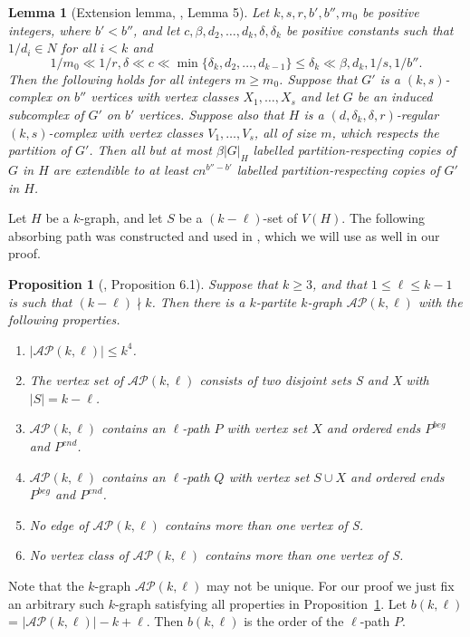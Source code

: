 \documentclass[11pt, reqno]{amsart}    	%
\newtheorem{prop}[thm]{Proposition}
\newtheorem{lemma}[thm]{Lemma}
\theoremstyle{definition}
\numberwithin{equation}{section}
\begin{document}
\begin{appendix}
		
		\begin{lemma}[Extension lemma, \cite{Cooley2009Embeddings}, Lemma 5]\label{exten lem}
			Let $k,s,r,b',b'',m_{0}$ be positive integers, where	$b'<b''$, and let $c,\beta,d_{2} ,\dots, d_{k},\delta,\delta_{k}$ be positive constants such that $1/d_{i} \in N$ for all $i < k$ and
			\[1/m_{0} \ll 1/r, \delta \ll c \ll \min\{\delta_{k}, d_{2} ,\dots, d_{k-1}\} \le \delta_{k} \ll \beta, d_{k}, 1/s, 1/b''.\]
			Then the following holds for all integers $m\ge m_{0}$. Suppose that $G'$
			is a $(k,s)$-complex on $b''$ vertices with vertex classes $X_{1}, \dots, X_{s}$ and let $G$ be an induced subcomplex of 
			$G'$ on $b'$ vertices.	Suppose also that $H$ is a  $(d,\delta_{k},\delta,r)$-regular  $(k,s)$-complex with vertex classes $V_{1},\dots,V_{s}$, all of size $m$, which respects the partition of $G'$. Then all but at most $\beta |G|_{H}$ labelled partition-respecting copies of $G$ in $H$ are extendible to at least $cn^{b''-b'}$ labelled partition-respecting copies	of $G'$ in $H$.	
		\end{lemma}
		
		Let $H$ be a $k$-graph, and let $S$ be a $( k-\ell) $-set of $V(H)$. 
		The following absorbing path was constructed and used in \cite{Daniela2010Hamilton}, which we will use as well in our proof.
		
		\begin{prop}[\cite{Daniela2010Hamilton}, Proposition 6.1]\label{Prop1} 
			Suppose that $k\ge3$, and that $1\leq \ell \leq k-1$ is such that $(k-\ell)\nmid k$. Then there is a $k$-partite $k$-graph $\mathcal{AP}(k,\ell)$ with the following properties.
			\begin{enumerate}
				\item $|\mathcal{AP}(k,\ell)|\le k^{4}$.
				\item The vertex set of $\mathcal{AP}(k,\ell)$ consists of two disjoint sets S and X with $|S| = k-\ell $.
				\item $\mathcal{AP}(k,\ell)$ contains an $ \ell $-path $P$ with vertex set 
				$X$ and ordered ends $ P^{beg} $ and $ P^{end} $.
				\item \label{prop1_4}$\mathcal{AP}(k,\ell)$ contains an $ \ell $-path $Q$ with vertex set $S\cup X$ and ordered ends $ P^{beg} $ and $ P^{end} $.
				\item \label{prop1_5}No edge of $\mathcal{AP}(k,\ell)$ contains more than one vertex of S.
				\item No vertex class of $\mathcal{AP}(k,\ell)$ contains more than one vertex of S.
			\end{enumerate}
		\end{prop}
		Note that the $k$-graph $\mathcal{AP}(k,\ell)$ may not be unique. 
		For our proof we just fix an arbitrary such $k$-graph satisfying all properties in Proposition~\ref{Prop1}.
		Let $b(k,\ell)$= $|\mathcal{AP}(k,\ell)|-k+\ell$. Then $b(k,\ell)$ is the order of the $ \ell $-path $P$.
		

\end{appendix}
\end{document}
